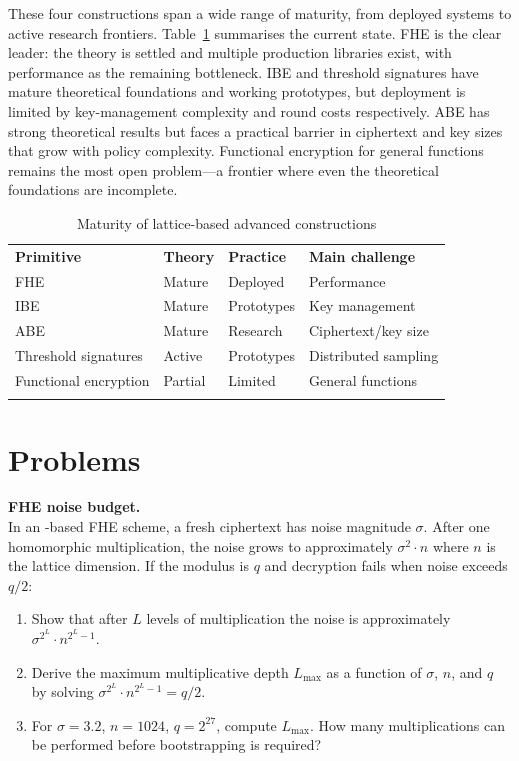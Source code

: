These four constructions span a wide range of maturity, from deployed systems to active research frontiers.  Table~\ref{tab:advanced-maturity} summarises the current state.  FHE is the clear leader: the theory is settled and multiple production libraries exist, with performance as the remaining bottleneck.  IBE and threshold signatures have mature theoretical foundations and working prototypes, but deployment is limited by key-management complexity and round costs respectively.  ABE has strong theoretical results but faces a practical barrier in ciphertext and key sizes that grow with policy complexity.  Functional encryption for general functions remains the most open problem---a frontier where even the theoretical foundations are incomplete.

\begin{table}[t]
\caption{Maturity of lattice-based advanced constructions}
\label{tab:advanced-maturity}
\begin{tabular}{p{3.5cm}p{2.5cm}p{2.5cm}p{3cm}}
\hline\noalign{\smallskip}
\textbf{Primitive} & \textbf{Theory} & \textbf{Practice} & \textbf{Main challenge} \\
\noalign{\smallskip}\svhline\noalign{\smallskip}
FHE & Mature & Deployed & Performance \\
IBE & Mature & Prototypes & Key management \\
ABE & Mature & Research & Ciphertext/key size \\
Threshold signatures & Active & Prototypes & Distributed sampling \\
Functional encryption & Partial & Limited & General functions \\
\noalign{\smallskip}\hline
\end{tabular}
\end{table}


\section*{Problems}

\begin{prob}
\label{prob:ch14-fhe}
\textbf{FHE noise budget.}\\
In an \lwe{}-based FHE scheme, a fresh ciphertext has noise magnitude $\sigma$.  After one homomorphic multiplication, the noise grows to approximately $\sigma^2 \cdot n$ where $n$ is the lattice dimension.  If the modulus is $q$ and decryption fails when noise exceeds $q/2$:
\begin{enumerate}
\item[(a)] Show that after $L$ levels of multiplication the noise is approximately $\sigma^{2^L} \cdot n^{2^L - 1}$.
\item[(b)] Derive the maximum multiplicative depth $L_{\max}$ as a function of $\sigma$, $n$, and $q$ by solving $\sigma^{2^L} \cdot n^{2^L - 1} = q/2$.
\item[(c)] For $\sigma = 3.2$, $n = 1024$, $q = 2^{27}$, compute $L_{\max}$.  How many multiplications can be performed before bootstrapping is required?
\end{enumerate}
\end{prob}

